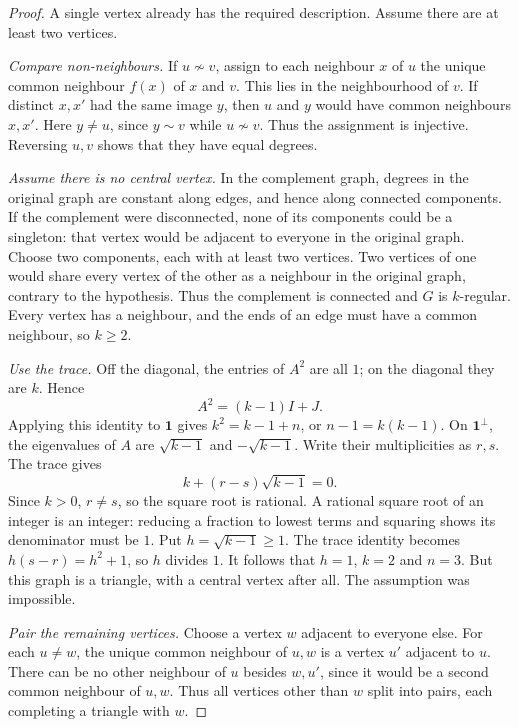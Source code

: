 \begin{proof}
A single vertex already has the required description. Assume there are at least two vertices.

\emph{Compare non-neighbours.} If $u\not\sim v$, assign to each neighbour $x$ of $u$ the unique common neighbour $f(x)$ of $x$ and $v$. This lies in the neighbourhood of $v$. If distinct $x,x'$ had the same image $y$, then $u$ and $y$ would have common neighbours $x,x'$. Here $y\ne u$, since $y\sim v$ while $u\not\sim v$. Thus the assignment is injective. Reversing $u,v$ shows that they have equal degrees.

\emph{Assume there is no central vertex.} In the complement graph, degrees in the original graph are constant along edges, and hence along connected components. If the complement were disconnected, none of its components could be a singleton: that vertex would be adjacent to everyone in the original graph. Choose two components, each with at least two vertices. Two vertices of one would share every vertex of the other as a neighbour in the original graph, contrary to the hypothesis. Thus the complement is connected and $G$ is $k$-regular. Every vertex has a neighbour, and the ends of an edge must have a common neighbour, so $k\ge2$.

\emph{Use the trace.} Off the diagonal, the entries of $A^2$ are all $1$; on the diagonal they are $k$. Hence
\[
A^2=(k-1)I+J.
\]
Applying this identity to $\mathbf1$ gives $k^2=k-1+n$, or $n-1=k(k-1)$. On $\mathbf1^\perp$, the eigenvalues of $A$ are $\sqrt{k-1}$ and $-\sqrt{k-1}$. Write their multiplicities as $r,s$. The trace gives
\[
k+(r-s)\sqrt{k-1}=0.
\]
Since $k>0$, $r\ne s$, so the square root is rational. A rational square root of an integer is an integer: reducing a fraction to lowest terms and squaring shows its denominator must be $1$. Put $h=\sqrt{k-1}\ge1$. The trace identity becomes $h(s-r)=h^2+1$, so $h$ divides $1$. It follows that $h=1$, $k=2$ and $n=3$. But this graph is a triangle, with a central vertex after all. The assumption was impossible.

\emph{Pair the remaining vertices.} Choose a vertex $w$ adjacent to everyone else. For each $u\ne w$, the unique common neighbour of $u,w$ is a vertex $u'$ adjacent to $u$. There can be no other neighbour of $u$ besides $w,u'$, since it would be a second common neighbour of $u,w$. Thus all vertices other than $w$ split into pairs, each completing a triangle with $w$.
\end{proof}

